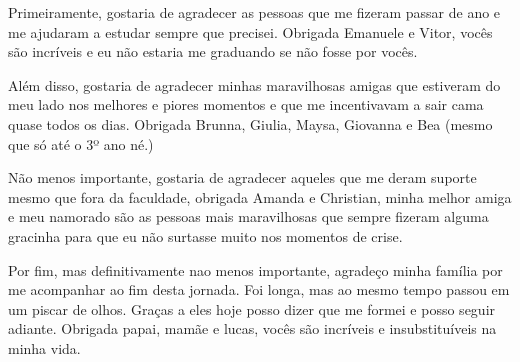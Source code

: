 \begin{agradecimentos}


   Primeiramente, gostaria de agradecer as pessoas que me fizeram passar de ano e me ajudaram a estudar sempre que precisei. Obrigada Emanuele e Vitor, vocês são incríveis e eu não estaria me graduando se não fosse por vocês. 

   Além disso, gostaria de agradecer minhas maravilhosas amigas que estiveram do meu lado nos melhores e piores momentos e que me incentivavam a sair cama quase todos os dias. Obrigada Brunna, Giulia, Maysa, Giovanna e Bea (mesmo que só até o 3º ano né.)

   Não menos importante, gostaria de agradecer aqueles que me deram suporte mesmo que fora da faculdade, obrigada Amanda e Christian, minha melhor amiga e meu namorado são as pessoas mais maravilhosas que sempre fizeram alguma gracinha para que eu não surtasse muito nos momentos de crise. 

   Por fim, mas definitivamente nao menos importante, agradeço minha família por me acompanhar ao fim desta jornada. Foi longa, mas ao mesmo tempo passou em um piscar de olhos. Graças a eles hoje posso dizer que me formei e posso seguir adiante. Obrigada papai, mamãe e lucas, vocês são incríveis e insubstituíveis na minha vida. 

\end{agradecimentos}
